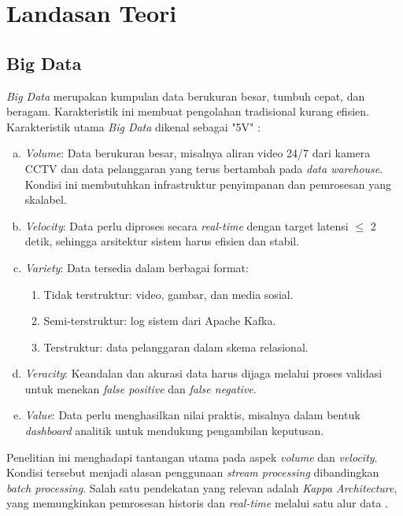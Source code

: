 \section{Landasan Teori}

\subsection{Big Data}

\textit{Big Data} merupakan kumpulan data berukuran besar, tumbuh cepat, dan
beragam. Karakteristik ini membuat pengolahan tradisional
kurang efisien. Karakteristik utama \textit{Big Data} dikenal sebagai "5V"
\cite{marz2015big}:

\begin{enumerate}[a.]
  \item \textit{Volume}: Data berukuran besar, misalnya aliran video 24/7 dari kamera CCTV dan data pelanggaran yang terus bertambah pada \textit{data warehouse}. Kondisi ini membutuhkan infrastruktur penyimpanan dan pemrosesan yang skalabel.

  \item \textit{Velocity}: Data perlu diproses secara \textit{real-time} dengan target latensi $\leq$ 2 detik, sehingga arsitektur sistem harus efisien dan stabil.

  \item \textit{Variety}: Data tersedia dalam berbagai format:
  \begin{enumerate}[1).]
    \item Tidak terstruktur: video, gambar, dan media sosial.
    \item Semi-terstruktur: log sistem dari Apache Kafka.
    \item Terstruktur: data pelanggaran dalam skema relasional.
  \end{enumerate}

\item \textit{Veracity}: Keandalan dan akurasi data harus dijaga melalui proses validasi untuk menekan \textit{false positive} dan \textit{false negative}.

\item \textit{Value}: Data perlu menghasilkan nilai praktis, misalnya dalam bentuk \textit{dashboard} analitik untuk mendukung pengambilan keputusan.
\end{enumerate}

Penelitian ini menghadapi tantangan utama pada aspek \textit{volume} dan
\textit{velocity}. Kondisi tersebut menjadi alasan penggunaan
\textit{stream processing} dibandingkan \textit{batch processing}. Salah satu
pendekatan yang relevan adalah \textit{Kappa Architecture}, yang memungkinkan
pemrosesan historis dan \textit{real-time} melalui satu alur data
\cite{marz2015big}.

